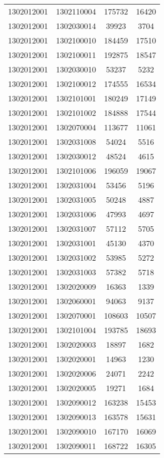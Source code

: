 \begin{longtable}[h]{llcc}
		1302012001 & 1302110004 & 175732 & 16420\\
		1302012001 & 1302030014 & 39923 & 3704\\
		1302012001 & 1302100010 & 184459 & 17510\\
		1302012001 & 1302100011 & 192875 & 18547\\
		1302012001 & 1302030010 & 53237 & 5232\\
		1302012001 & 1302100012 & 174555 & 16534\\
		1302012001 & 1302101001 & 180249 & 17149\\
		1302012001 & 1302101002 & 184888 & 17544\\
		1302012001 & 1302070004 & 113677 & 11061\\
		1302012001 & 1302031008 & 54024 & 5516\\
		1302012001 & 1302030012 & 48524 & 4615\\
		1302012001 & 1302101006 & 196059 & 19067\\
		1302012001 & 1302031004 & 53456 & 5196\\
		1302012001 & 1302031005 & 50248 & 4887\\
		1302012001 & 1302031006 & 47993 & 4697\\
		1302012001 & 1302031007 & 57112 & 5705\\
		1302012001 & 1302031001 & 45130 & 4370\\
		1302012001 & 1302031002 & 53985 & 5272\\
		1302012001 & 1302031003 & 57382 & 5718\\
		1302012001 & 1302020009 & 16363 & 1339\\
		1302012001 & 1302060001 & 94063 & 9137\\
		1302012001 & 1302070001 & 108603 & 10507\\
		1302012001 & 1302101004 & 193785 & 18693\\
		1302012001 & 1302020003 & 18897 & 1682\\
		1302012001 & 1302020001 & 14963 & 1230\\
		1302012001 & 1302020006 & 24071 & 2242\\
		1302012001 & 1302020005 & 19271 & 1684\\
		1302012001 & 1302090012 & 163238 & 15453\\
		1302012001 & 1302090013 & 163578 & 15631\\
		1302012001 & 1302090010 & 167170 & 16069\\
		1302012001 & 1302090011 & 168722 & 16305\\

\end{longtable}
